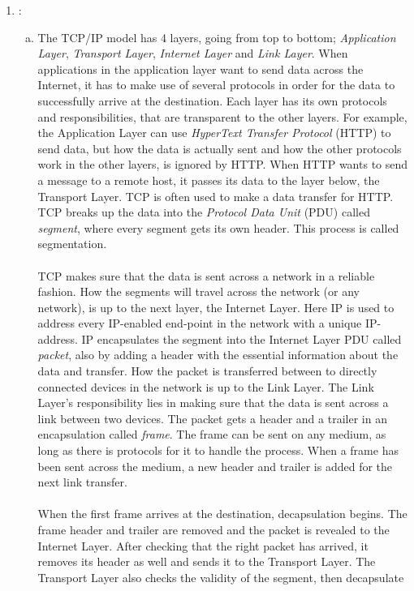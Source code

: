 \documentclass[a4paper,9pt,fleqn]{article}
\begin{document}
\begin{enumerate}[{Task} 1]
	\item :
	\begin{enumerate}[a)]
		\item 
		The TCP/IP model has 4 layers, going from top to bottom; {\it Application Layer},
		{\it Transport Layer}, {\it Internet Layer} and {\it Link Layer}. When applications
		in the application layer want to send data across the Internet, it has to make use of
		several protocols in order for the data to successfully arrive at the
		destination. Each layer has its own protocols and responsibilities, that
		are transparent to the other layers. For example, the Application Layer can
		use {\it HyperText Transfer Protocol} (HTTP) to send data, but how the data
		is actually sent and how the other protocols work in the other layers, is
		ignored by HTTP. When HTTP wants to send a message to a remote host, it
		passes its data to the layer below, the Transport Layer. TCP is often used
		to make a data transfer for HTTP. TCP breaks up the data into the {\it Protocol
		Data Unit} (PDU) called {\it segment}, where every segment gets its own header. This
		process is called segmentation.
		\\ \\
		TCP makes sure that the data is sent across a network in a reliable fashion.
		How the segments will travel across the network (or any network), is up to the next
		layer, the Internet Layer. Here IP is used to address every IP-enabled end-point in
		the network with a unique IP-address. IP encapsulates the segment into the
		Internet Layer PDU called {\it packet}, also by adding a header with the essential
		information about the data and transfer. How the packet is transferred between to
		directly connected devices in the network is up to the Link Layer. The Link Layer's
		responsibility lies in making sure that the data is sent across a link
		between two devices. The packet gets a header and a trailer in an
		encapsulation called {\it frame}. The frame can be sent on any medium, as long
		as there is protocols for it to handle the process. When a frame has been sent
		across the medium, a new header and trailer is added for the next link
		transfer.
		\\ \\
		When the first frame arrives at the destination, decapsulation begins.
		The frame header and trailer are removed and the packet is revealed to the
		Internet Layer. After checking that the right packet has arrived, it
		removes its header as well and sends it to the Transport Layer. The
		Transport Layer also checks the validity of the segment, then decapsulate

\end{enumerate}
\end{enumerate}
\end{document}
